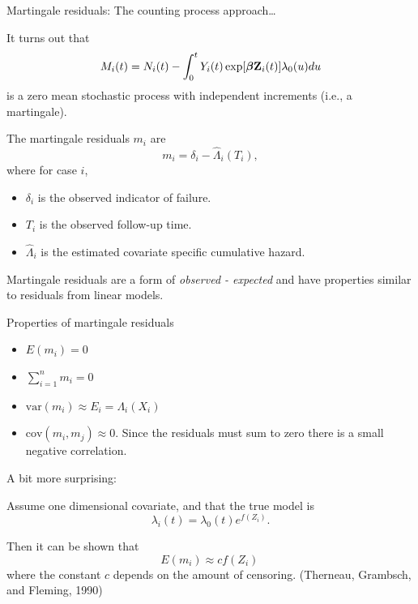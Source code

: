 \documentclass[ignorenonframetext,]{beamer}
\newcommand{\bbeta}{\mbox{\boldmath$\beta$}}
\begin{document}
\begin{frame}{%
\protect\hypertarget{martingale-residuals-the-counting-process-approach-1}{%
Martingale residuals: The counting process approach\ldots}}

It turns out that \[
   M_i(t) = N_i(t) - \int_0^t Y_i(t) \exp[\bbeta {\bf Z}_i(t)] \lambda_0(u)du 
\] is a zero mean stochastic process with independent increments (i.e.,
a martingale).

The martingale residuals \(m_i\) are
\[m_i = \delta_i - \widehat{\Lambda}_i(T_i),\] where for case \(i\),

\begin{itemize}
\item
  \(\delta_i\) is the observed indicator of failure.
\item
  \(T_i\) is the observed follow-up time.
\item
  \(\widehat{\Lambda}_i\) is the estimated covariate specific cumulative
  hazard.
\end{itemize}

Martingale residuals are a form of \emph{observed - expected} and have
properties similar to residuals from linear models.

\end{frame}

\begin{frame}{%
\protect\hypertarget{properties-of-martingale-residuals}{%
Properties of martingale residuals}}

\begin{itemize}
\item
  \(E(m_i) = 0\)
\item
  \(\sum_{i=1}^n m_i = 0\)
\item
  \(\text{var}(m_i) \approx E_i = \Lambda_i(X_i)\)
\item
  \(\text{cov}(m_i, m_j) \approx 0\). Since the residuals must sum to
  zero there is a small negative correlation.
\end{itemize}

A bit more surprising:

Assume one dimensional covariate, and that the true model is \[
        \lambda_i(t) = \lambda_0(t) e^{f(Z_i)}.
\]

Then it can be shown that \[
   E(m_i) \approx c f(Z_i) \,
\] where the constant \(c\) depends on the amount of censoring.
(Therneau, Grambsch, and Fleming, 1990)

\end{frame}
\end{document}
